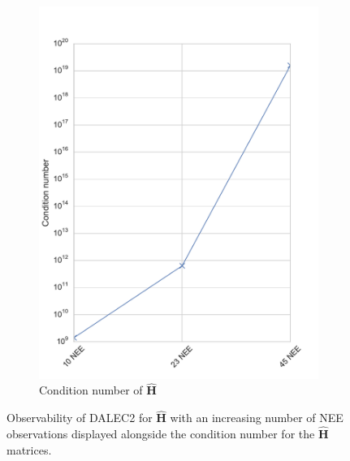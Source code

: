 \documentclass[11pt]{article}
\begin{document}
\begin{figure}[ht]
\begin{subfigure}[b]{0.4\textwidth}
        \includegraphics[width=\textwidth]{dalec2_obsrankcond.pdf}
        \caption{Condition number of $\hat{\textbf{H}}$}
        \label{fig:D2_observabilitycond}
    \end{subfigure}
    \caption{Observability of DALEC2 for $\hat{\textbf{H}}$ with an increasing number of NEE observations displayed alongside the condition number for the $\hat{\textbf{H}}$ matrices.}
    \label{fig:D2_observability}
\end{figure}
\end{document}

